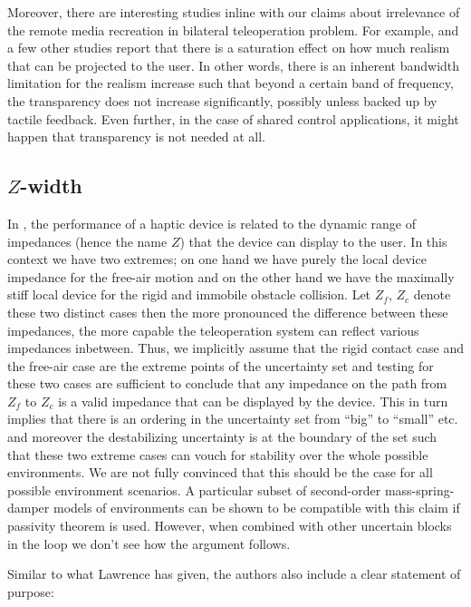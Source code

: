 Moreover, there are interesting studies inline with our claims about irrelevance of the remote media recreation in bilateral
teleoperation problem. For example, \cite{kilchenman,wildenbeest,boessenkool} and a few other studies report that there is a saturation
effect on how much realism that can be projected to the user. In other words, there is an inherent bandwidth limitation for 
the realism increase such that beyond a certain band of frequency, the transparency does not increase significantly, possibly
unless backed up by tactile feedback. Even further, in the case of shared control applications, it might happen that transparency 
is not needed at all. 



\subsection{\texorpdfstring{$Z$}{Z}-width}

In \cite{colgate4}, the performance of a haptic device is related to the dynamic range of impedances (hence the name $Z$) that
the device can display to the user. In this context we have two extremes; on one hand we have purely the local device impedance 
for the free-air motion and on the other hand we have the maximally stiff local device for the rigid and immobile obstacle collision. 
Let $Z_f$, $Z_c$ denote these two distinct cases then the more pronounced the difference between these impedances, the more 
capable the teleoperation system can reflect various impedances inbetween. Thus, we implicitly assume that the rigid contact 
case and the free-air case are the extreme points of the uncertainty set and testing for these two cases are sufficient to 
conclude that any impedance on the path from $Z_f$ to $Z_c$ is a valid impedance that can be displayed by the device. This
in turn implies that there is an ordering in the uncertainty set from \enquote{big} to \enquote{small} etc. and moreover 
the destabilizing uncertainty is at the boundary of the set such that these two extreme cases can vouch for stability over 
the whole possible environments. We are not fully convinced that this should be the case for all possible environment 
scenarios. A particular subset of second-order mass-spring-damper models of environments can be shown to be compatible 
with this claim if passivity theorem is used. However, when combined with other uncertain blocks in the loop we don't see
how the argument follows.

Similar to what Lawrence has given, the authors also include a clear statement of purpose: 

